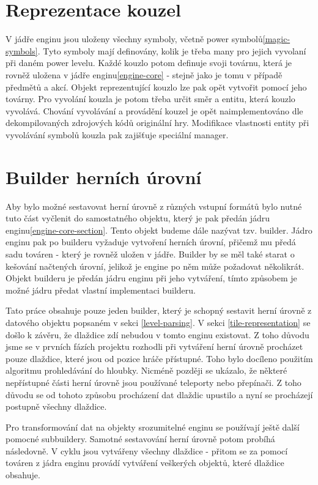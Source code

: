\section{Reprezentace kouzel}
V jádře enginu jsou uloženy všechny symboly, včetně power symbolů\vref{magic-symbols}.
Tyto symboly mají definovány, kolik je třeba many pro jejich vyvolaní při daném power levelu.
Každé kouzlo potom definuje svoji továrnu, která je rovněž uložena v jádře enginu\vref{engine-core} - stejně jako je tomu v případě předmětů a akcí.
Objekt reprezentující kouzlo lze pak opět vytvořit pomocí jeho továrny. Pro vyvolání kouzla je potom třeba určit směr a entitu,
která kouzlo vyvolává. Chování vyvolávání a provádění kouzel je opět naimplementováno dle dekompilovaných
zdrojových kódů\cite{DMDecompilation} originální hry. Modifikace vlastnosti entity při vyvolávání symbolů
kouzla pak zajišťuje speciální manager. 

\section{Builder herních úrovní}

Aby bylo možné sestavovat herní úrovně z různých vstupní formátů bylo nutné tuto část vyčlenit do samostatného
objektu, který je pak předán jádru enginu\vref{engine-core-section}. Tento objekt budeme dále nazývat tzv. builder. Jádro enginu
pak po builderu vyžaduje vytvoření herních úrovní, přičemž mu předá sadu továren - který je rovněž uložen v jádře. Builder
by se měl také starat o kešování načtených úrovní, jelikož je engine po něm může požadovat několikrát. Objekt builderu
je předán jádru enginu při jeho vytváření, tímto způsobem je možné jádru předat vlastní implementaci builderu.

Tato práce obsahuje pouze jeden builder, který je schopný sestavit herní úrovně z datového objektu popsaném v sekci \ref{level-parsing}.
V sekci \ref{tile-representation} se došlo k závěru, že dlaždice zdí nebudou v tomto enginu existovat. Z toho důvodu jsme se 
v prvních fázích projektu rozhodli při vytváření herní úrovně procházet pouze dlaždice, které jsou od pozice hráče přístupné.
Toho bylo docíleno použitím algoritmu prohledávání do hloubky. Nicméně později se ukázalo, že některé nepřístupné části herní úrovně
jsou používané teleporty nebo přepínači. Z toho důvodu se od tohoto způsobu procházení dat dlaždic upustilo a nyní se procházejí 
postupně všechny dlaždice.

Pro transformování dat na objekty srozumitelné enginu se používají ještě další pomocné subbuildery. 
Samotné sestavování herní úrovně potom probíhá následovně. V cyklu jsou vytvářeny všechny dlaždice - přitom se za pomocí továren 
z jádra enginu provádí vytváření veškerých objektů, které dlaždice obsahuje.

